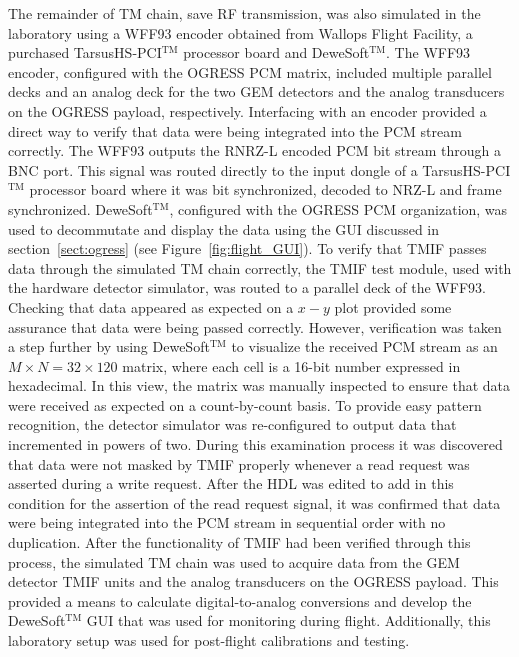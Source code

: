 \documentclass{ws-jai}
\begin{document}
The remainder of TM chain, save RF transmission, was also simulated in the laboratory using a WFF93 encoder obtained from Wallops Flight Facility, a purchased TarsusHS-PCI$^\text{TM}$ processor board and DeweSoft$^\text{TM}$. The WFF93 encoder, configured with the OGRESS PCM matrix, included multiple parallel decks and an analog deck for the two GEM detectors and the analog transducers on the OGRESS payload, respectively. Interfacing with an encoder provided a direct way to verify that data were being integrated into the PCM stream correctly. The WFF93 outputs the RNRZ-L encoded PCM bit stream through a BNC port. This signal was routed directly to the input dongle of a TarsusHS-PCI$^\text{TM}$ processor board where it was bit synchronized, decoded to NRZ-L and frame synchronized. DeweSoft$^\text{TM}$, configured with the OGRESS PCM organization, was used to decommutate and display the data using the GUI discussed in section~\ref{sect:ogress} (see Figure~\ref{fig:flight_GUI}). To verify that TMIF passes data through the simulated TM chain correctly, the TMIF test module, used with the hardware detector simulator, was routed to a parallel deck of the WFF93. Checking that data appeared as expected on a $x-y$ plot provided some assurance that data were being passed correctly. However, verification was taken a step further by using DeweSoft$^\text{TM}$ to visualize the received PCM stream as an $M \times N = 32 \times 120$ matrix, where each cell is a 16-bit number expressed in hexadecimal. In this view, the matrix was manually inspected to ensure that data were received as expected on a count-by-count basis. To provide easy pattern recognition, the detector simulator was re-configured to output data that incremented in powers of two. During this examination process it was discovered that data were not masked by TMIF properly whenever a read request was asserted during a write request. After the HDL was edited to add in this condition for the assertion of the read request signal, it was confirmed that data were being integrated into the PCM stream in sequential order with no duplication. After the functionality of TMIF had been verified through this process, the simulated TM chain was used to acquire data from the GEM detector TMIF units and the analog transducers on the OGRESS payload. This provided a means to calculate digital-to-analog conversions and develop the DeweSoft$^\text{TM}$ GUI that was used for monitoring during flight. Additionally, this laboratory setup was used for post-flight calibrations and testing.
\end{document}
